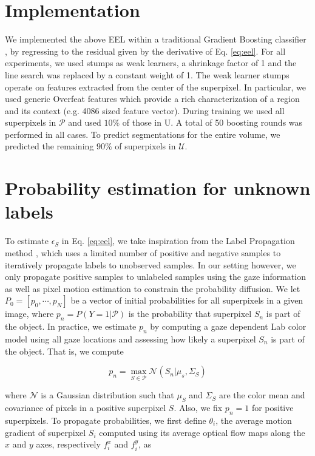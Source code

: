 \section{Implementation}
We implemented the above EEL within a traditional Gradient Boosting classifier \cite{hastie09},
by regressing to the residual given by the derivative of Eq. \ref{eq:eel}.
For all experiments, we used stumps as weak learners, a shrinkage factor of 1 and the line search was replaced by a constant weight of 1.
The weak learner stumps operate on features extracted from the center of the superpixel.
In particular, we used generic Overfeat features \cite{sermanet13} which provide a rich
characterization of a region and its context (e.g. 4086 sized feature vector).
During training we used all superpixels in $\mathcal{P}$ and used $10\%$ of those in U.
A total of 50 boosting rounds was performed in all cases.
To predict segmentations for the entire volume, we
predicted the remaining $90\%$ of superpixels in $\mathcal{U}$.

\section{Probability estimation for unknown labels}
\label{sec:eel_estim}
To estimate $\epsilon_{S}$ in Eq. \ref{eq:eel}, we take inspiration from the Label Propagation method \cite{zhou04}, which uses a limited number of positive and negative samples to iteratively propagate labels to unobserved samples.
In our setting however, we only propagate positive samples to unlabeled
samples using the gaze information as well as pixel motion estimation to constrain the probability diffusion.
We let $P_{0} = \left[p_0,\cdots, p_{N}\right]$ be a vector of initial probabilities for all superpixels in a given image, where $p_n = P(Y = 1|\mathcal{P})$ is the probability that superpixel $S_{n}$ is part of the object.
In practice, we estimate $p_{n}$ by computing a gaze dependent Lab color model using all gaze
locations and assessing how likely a superpixel $S_{n}$ is part of the object.
That is, we compute

\begin{equation}
  p_{n} = \max_{S \in \mathcal{P}} \mathcal{N}(S_{n}|\mu_{s},\Sigma_{S})
  \end{equation}

  where $\mathcal{N}$ is a Gaussian distribution such that $\mu_{S}$ and $\Sigma_{S}$ are the color mean and covariance of pixels in a positive superpixel $S$.
  Also, we fix $p_{n}=1$ for positive superpixels.
  To propagate probabilities, we first define $\theta_{i}$, the average motion gradient of superpixel $S_{i}$ computed
  using its average optical flow maps along the $x$ and $y$ axes, respectively $f_{i}^{x}$ and $f_{i}^{y}$,  as

